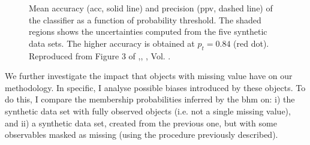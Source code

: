 \begin{figure}[ht!]
\begin{center}
\caption{Mean accuracy (\gls{acc}, solid line) and precision (\gls{ppv}, dashed line) of the classifier as a function of probability threshold. The shaded regions shows the uncertainties computed from the five synthetic data sets. The higher accuracy is obtained at $p_t=0.84$ (red dot). Reproduced from Figure 3 of \citet{Olivares2017},\textit{}, , Vol. .}
\label{fig:ACC}
\end{center}
\end{figure}

We further investigate the impact that objects with missing value have on our methodology. In specific, I analyse possible biases introduced by these objects. To do this, I compare the membership probabilities inferred by the \gls{bhm} on:  i) the synthetic data set with fully observed objects (i.e. not a single missing value), and ii) a synthetic data set, created from the previous one, but with some observables masked as missing (using the procedure previously described).

